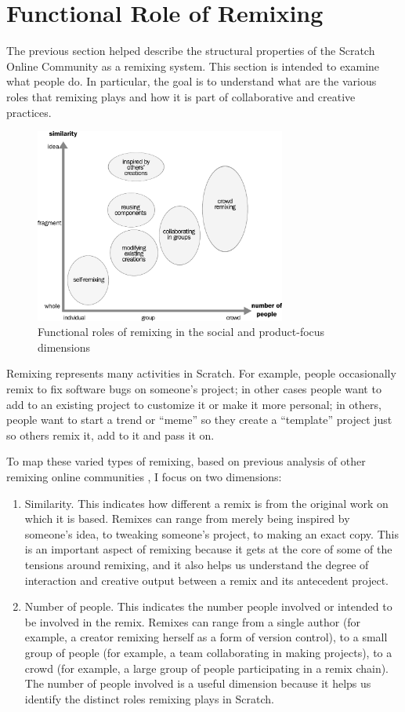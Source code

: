 \chapter{Functional Role of Remixing}

The previous section helped describe the structural properties of the Scratch Online Community as a remixing system.
This section is intended to examine what people do.
In particular, the goal is to understand what are the various roles that remixing plays and how it is part of collaborative and creative practices.

\begin{figure}
\centering
\includegraphics[width=3.25in]{figures/function.pdf}
\caption{Functional roles of remixing in the social and product-focus dimensions}
\label{fig:function}
\end{figure}

Remixing represents many activities in Scratch.
For example, people occasionally remix to fix software bugs on someone's project; in other cases people want to add to an existing project to customize it or make it more personal; in others, people want to start a trend or ``meme'' so they create a ``template'' project just so others remix it, add to it and pass it on.

To map these varied types of remixing, based on previous analysis of other remixing online communities \citep{seneviratne_remix_2010}, I focus on two dimensions:
\begin{enumerate}
\item{Similarity}. This indicates how different a remix is from the original work on which it is based. 
Remixes can range from merely being inspired by someone's idea, to tweaking someone's project, to making an exact copy.
This is an important aspect of remixing because it gets at the core of some of the tensions around remixing, and it also helps us understand the degree of interaction and creative output between a remix and its antecedent project.
\item{Number of people}. This indicates the number people involved or intended to be involved in the remix.
Remixes can range from a single author (for example, a creator remixing herself as a form of version control), to a small group of people (for example, a team collaborating in making projects), to a crowd (for example, a large group of people participating in a remix chain).
The number of people involved is a useful dimension because it helps us identify the distinct roles remixing plays in Scratch.
\end{enumerate}

